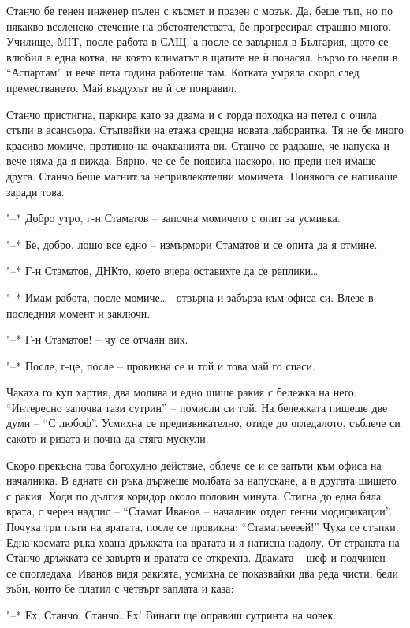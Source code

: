 \documentclass[ebook,openany,12pt]{memoir}
\begin{document}
Станчо бе генен инженер пълен с късмет и празен с мозък. Да, беше тъп, но по някакво вселенско стечение на обстоятелствата, бе прогресирал страшно много. Училище, MIT, после работа в САЩ, а после се завърнал в България, щото се влюбил в една котка, на която климатът в щатите не ѝ понасял. Бързо го наели в ``Аспартам'' и вече пета година работеше там. Котката умряла скоро след преместването. Май въздухът не ѝ се понравил.

Станчо пристигна, паркира като за двама и с горда походка на петел с очила стъпи в асансьора. Стъпвайки на етажа срещна новата лаборантка. Тя не бе много красиво момиче, противно на очакванията ви. Станчо се радваше, че напуска и вече няма да я вижда. Вярно, че се бе появила наскоро, но преди нея имаше друга. Станчо беше магнит за непривлекателни момичета. Понякога се напиваше заради това.

"--* Добро утро, г-н Стаматов – започна момичето с опит за усмивка.

"--* Бе, добро, лошо все едно – измърмори Стаматов и се опита да я отмине.

"--* Г-н Стаматов, ДНКто, което вчера оставихте да се реплики\ldots 

"--* Имам работа, после момиче\ldots – отвърна и забърза към офиса си. Влезе в последния момент и заключи.

"--* Г-н Стаматов! – чу се отчаян вик.

"--* После, г-це, после – провикна се и той и това май го спаси.

Чакаха го куп хартия, два молива и едно шише ракия с бележка на него. ``Интересно започва тази сутрин'' – помисли си той. На бележката пишеше две думи – ``С любоф''. Усмихна се предизвикателно, отиде до огледалото, съблече си сакото и ризата и почна да стяга мускули.

Скоро прекъсна това богохулно действие, облече се и се запъти към офиса на началника. В едната си ръка държеше молбата за напускане, а в другата шишето с ракия. Ходи по дългия коридор около половин минута. Стигна до една бяла врата, с черен надпис – ``Стамат Иванов – началник отдел генни модификации''. Почука три пъти на вратата, после се провикна: ``Стаматьеееей!'' Чуха се стъпки. Една космата ръка хвана дръжката на вратата и я натисна надолу. От страната на Станчо дръжката се завъртя и вратата се открехна. Двамата – шеф и подчинен – се спогледаха. Иванов видя ракията, усмихна се показвайки два реда чисти, бели зъби, които бе платил с четвърт заплата и каза:

"--* Ех, Станчо, Станчо\ldots Ех! Винаги ще оправиш сутринта на човек.
\end{document}
